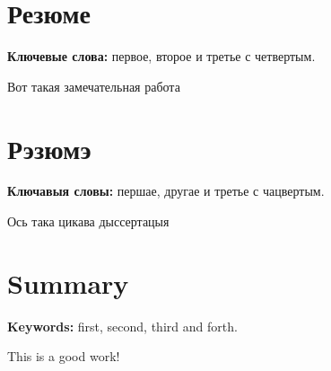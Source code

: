 \section*{Резюме}

\begin{center}
\large{\thesisAuthor}\par
\large{\thesisTitle}
\end{center}

\textbf{Ключевые слова:} первое, второе и третье с четвертым.

Вот такая замечательная работа

\newpage
\section*{Рэзюмэ}

\begin{center}
	\large{\thesisAuthor}\par
	\large{\thesisTitle}
\end{center}

\textbf{Ключавыя словы:} першае, другае и третье с чацвертым.

Ось така цикава дыссертацыя

\newpage
\section*{Summary}

\begin{center}
	\large{\thesisAuthor}\par
	\large{\thesisTitle}
\end{center}

\textbf{Keywords:} first, second, third and forth.

This is a good work!

